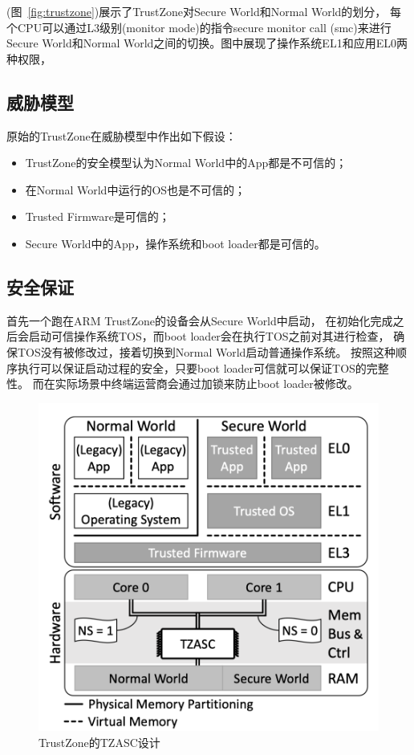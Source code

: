 (图~\ref{fig:trustzone})展示了TrustZone对Secure World和Normal World的划分，
每个CPU可以通过L3级别(monitor mode)的指令secure monitor call (smc)来进行
Secure World和Normal World之间的切换。图中展现了操作系统EL1和应用EL0两种权限，


\subsection {威胁模型} 
原始的TrustZone在威胁模型中作出如下假设：
\begin{itemize}
    \item
    TrustZone的安全模型认为Normal World中的App都是不可信的；
    \item
    在Normal World中运行的OS也是不可信的；
    \item 
    Trusted Firmware是可信的；
    \item
    Secure World中的App，操作系统和boot loader都是可信的。
\end{itemize}

\subsection{安全保证}
首先一个跑在ARM TrustZone的设备会从Secure World中启动，
在初始化完成之后会启动可信操作系统TOS，而boot loader会在执行TOS之前对其进行检查，
确保TOS没有被修改过，接着切换到Normal World启动普通操作系统。
按照这种顺序执行可以保证启动过程的安全，只要boot loader可信就可以保证TOS的完整性。
而在实际场景中终端运营商会通过加锁来防止boot loader被修改。

\begin{figure}
    \centering
    \includegraphics[scale=0.6]{Figures/trustzone/TZASC.png}
    \decoRule
    \caption{TrustZone的TZASC设计}
    \label{fig:tzasc}
\end{figure}
    
